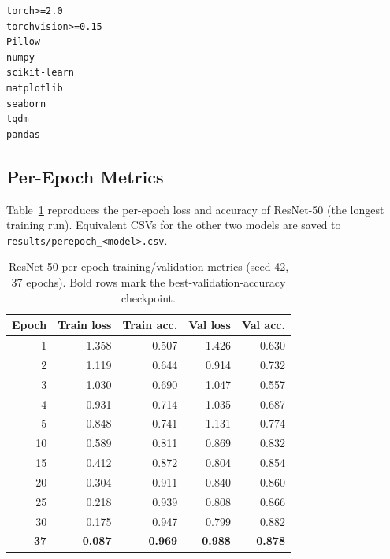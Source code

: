 \documentclass[conference,10pt]{IEEEtran}
\begin{document}
\begin{lstlisting}[caption={Pinned requirements.txt for full reproducibility.},
label={lst:reqs},basicstyle=\ttfamily\footnotesize,frame=single]
torch>=2.0
torchvision>=0.15
Pillow
numpy
scikit-learn
matplotlib
seaborn
tqdm
pandas
\end{lstlisting}

\subsection{Per-Epoch Metrics}

Table~\ref{tab:perepoch_resnet} reproduces the per-epoch loss and accuracy of
ResNet-50 (the longest training run). Equivalent CSVs for the other two
models are saved to \texttt{results/perepoch\_<model>.csv}.

\begin{table}[!h]
\centering
\caption{ResNet-50 per-epoch training/validation metrics (seed 42, 37
epochs). Bold rows mark the best-validation-accuracy checkpoint.}
\label{tab:perepoch_resnet}
\renewcommand{\arraystretch}{1.05}
\footnotesize
\begin{tabular}{rrrrr}
\toprule
\textbf{Epoch} & \textbf{Train loss} & \textbf{Train acc.} & \textbf{Val loss} & \textbf{Val acc.}\\
\midrule
1  & 1.358 & 0.507 & 1.426 & 0.630 \\
2  & 1.119 & 0.644 & 0.914 & 0.732 \\
3  & 1.030 & 0.690 & 1.047 & 0.557 \\
4  & 0.931 & 0.714 & 1.035 & 0.687 \\
5  & 0.848 & 0.741 & 1.131 & 0.774 \\
10 & 0.589 & 0.811 & 0.869 & 0.832 \\
15 & 0.412 & 0.872 & 0.804 & 0.854 \\
20 & 0.304 & 0.911 & 0.840 & 0.860 \\
25 & 0.218 & 0.939 & 0.808 & 0.866 \\
30 & 0.175 & 0.947 & 0.799 & 0.882 \\
\textbf{37} & \textbf{0.087} & \textbf{0.969} & \textbf{0.988} & \textbf{0.878} \\
\bottomrule
\end{tabular}
\end{table}
\end{document}
